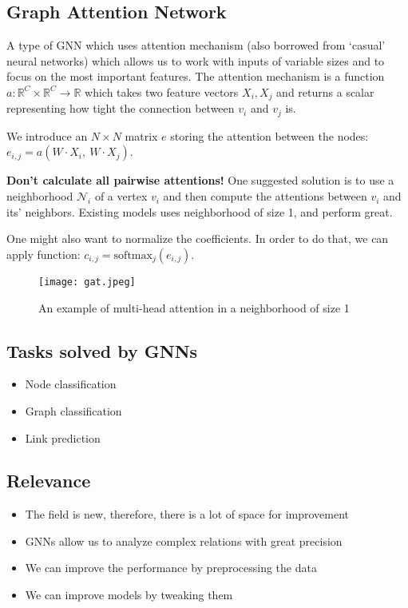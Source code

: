 \subsection{Graph Attention Network}
\begin{frame}[allowframebreaks]{\subsecname}
	A type of GNN which uses attention mechanism (also borrowed from `casual' neural networks) which allows us to work with inputs of variable sizes and to focus on the most important features.
	The attention mechanism is a function $a: \mathbb{R}^C \times \mathbb{R}^C \rightarrow \mathbb{R}$ which takes two feature vectors $X_i, X_j$ and returns a scalar representing how tight the connection between $v_i$ and $v_j$ is.

	\framebreak

	We introduce an $N \times N$ matrix $e$ storing the attention between the nodes: $e_{i, j} = a\left( W \cdot X_i,\ W \cdot X_j \right)$.

	\textbf{Don't calculate all pairwise attentions!}
	One suggested solution is to use a neighborhood $\mathcal{N}_i$ of a vertex $v_i$ and then compute the attentions between $v_i$ and its' neighbors.
	Existing models uses neighborhood of size 1, and perform great.

	One might also want to normalize the coefficients.
	In order to do that, we can apply  function: $c_{i, j} = \text{softmax}_j \left( e_{i, j} \right)$.

	\begin{figure}[h]
		\centering
		\texttt{[image: gat.jpeg]}
		\caption{An example of multi-head attention in a neighborhood of size 1}
	\end{figure}
\end{frame}

\subsection{Tasks solved by GNNs}
\begin{frame}{\subsecname}
	\begin{itemize}
		\item Node classification
		\item Graph classification
		\item Link prediction
	\end{itemize}
\end{frame}

\subsection{Relevance}
\begin{frame}{\subsecname}
	\begin{itemize}
		\item The field is new, therefore, there is a lot of space for improvement
		\item GNNs allow us to analyze complex relations with great precision
		\item We can improve the performance by preprocessing the data
		\item We can improve models by tweaking them
	\end{itemize}
\end{frame}
